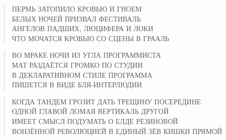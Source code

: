 \poemtitle{***}
\begin{verse}
ПЕРМЬ ЗАТОПИЛО КРОВЬЮ И ГНОЕМ\\
БЕЛЫХ НОЧЕЙ ПРИЗВАЛ ФЕСТИВАЛЬ\\
АНГЕЛОВ ПАДШИХ, ЛЮЦИФЕРА И ЛОКИ\\
ЧТО МОЧАТСЯ КРОВЬЮ СО СЦЕНЫ В ГРААЛЬ
\end{verse}

\poemtitle{***}
\begin{verse}
ВО МРАКЕ НОЧИ ИЗ УГЛА ПРОГРАММИСТА\\
МАТ РАЗДАЁТСЯ ГРОМКО ПО СТУДИИ\\
В ДЕКЛАРАТИВНОМ СТИЛЕ ПРОГРАММА\\
ПИШЕТСЯ В ВИДЕ БЛЯ-ИНТЕРЛЮДИИ
\end{verse}

\poemtitle{***}
\begin{verse}
КОГДА ТАНДЕМ ГРОЗИТ ДАТЬ ТРЕЩИНУ ПОСЕРЕДИНЕ\\
ОДНОЙ ГЛАВОЙ ЛОМАЯ ВЕРТИКАЛЬ ДРУГОЙ\\
ИМЕЕТ СМЫСЛ ПОДУМАТЬ О ЕЛДЕ РЕЗИНОВОЙ\\
ВОНЗЁННОЙ РЕВОЛЮЦИЕЙ В ЕДИНЫЙ ЗЁВ КИШКИ ПРЯМОЙ
\end{verse}

